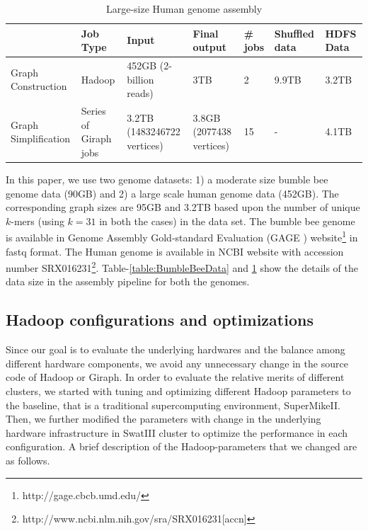 \documentclass[conference]{IEEEtran}
\begin{document}
\begin{table}
\begin{center}
    \begin{tabular}{ |p{1.1cm} | p{0.8cm} | p{1.1cm} | p{0.8cm} | p{0.8cm} | p{0.8cm} | p{0.8cm}|} \hline
    & Job Type & Input & Final output & \# jobs & Shuffled data & HDFS Data \\ \hline
    Graph Construction & Hadoop & 452GB (2-billion reads) & 3TB & 2 & 9.9TB & 3.2TB \\ \hline
    Graph Simplification & Series of Giraph jobs & 3.2TB (1483246722 vertices) & 3.8GB (2077438 vertices) & 15 & - & 4.1TB \\ \hline    
    \end{tabular}
    \caption{Large-size Human genome assembly}
	\label{table:HumanData}
\end{center}
\end{table}
In this paper, we use two genome datasets: 1) a moderate size bumble bee genome data (90GB) and 2) a large scale human genome data (452GB).
The corresponding graph sizes are 95GB and 3.2TB based upon the number of unique $k$-mers (using $k=31$ in both the cases) in the data set.
The bumble bee genome is available in Genome Assembly Gold-standard Evaluation (GAGE \cite{bio:gage}) website\footnote{http://gage.cbcb.umd.edu/} in fastq format.
The Human genome is available in NCBI website with accession number SRX016231\footnote{http://www.ncbi.nlm.nih.gov/sra/SRX016231[accn]}.
Table-\ref{table:BumbleBeeData} and \ref{table:HumanData} show the details of the data size in the assembly pipeline for both the genomes.

\subsection {Hadoop configurations and optimizations} \label{HadoopConfigurationsAndoptimizations}
Since our goal is to evaluate the underlying hardwares and the balance among different hardware components, we avoid any unnecessary change in the source code of Hadoop or Giraph. 
In order to evaluate the relative merits of different clusters, we started with tuning and optimizing different Hadoop parameters to the baseline, that is a traditional supercomputing environment, SuperMikeII. Then, we further modified the parameters with change in the underlying hardware infrastructure in SwatIII cluster to optimize the performance in each configuration.
A brief description of the Hadoop-parameters that we changed are as follows.
  
\end{document}

